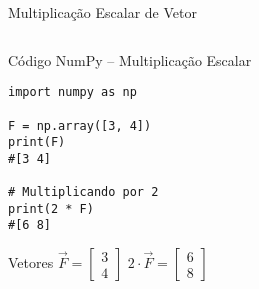 \begin{frame}[fragile]{Multiplicação Escalar de Vetor}

    \begin{columns}
        \begin{column}{0.55\textwidth}
            \begin{block}{Código NumPy – Multiplicação Escalar}
                \begin{verbatim}
import numpy as np

F = np.array([3, 4])
print(F)
#[3 4]

# Multiplicando por 2
print(2 * F)
#[6 8]
\end{verbatim}
            \end{block}

            \vspace{0.3cm}
            \begin{block}{Vetores}
                $\vec{F} = \begin{bmatrix} 3 \\ 4 \end{bmatrix}$ \quad
                $2 \cdot \vec{F} = \begin{bmatrix} 6 \\ 8 \end{bmatrix}$
            \end{block}
        \end{column}

        \begin{column}{0.45\textwidth}
            \begin{center}
            \end{center}
        \end{column}
    \end{columns}

\end{frame}


